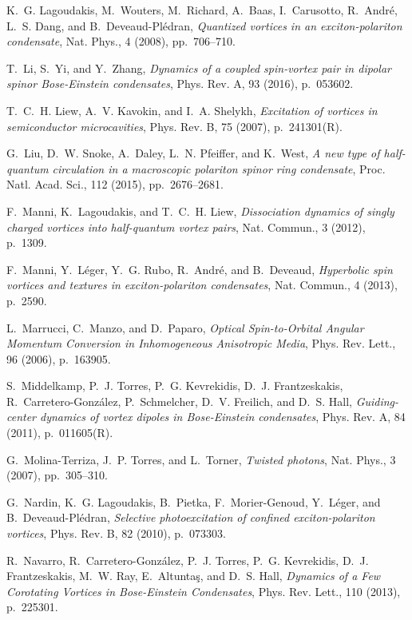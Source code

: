 \documentclass[aps,prb,twocolumn,superscriptaddress,nofootinbib]{revtex4}
\begin{document}
\begin{thebibliography}{10}
{\sc K.~G. Lagoudakis, M.~Wouters, M.~Richard, A.~Baas, I.~Carusotto,
  R.~Andr\'{e}, L.~S. Dang, and B.~Deveaud-Pl\'{e}dran}, {\em Quantized
  vortices in an exciton-polariton condensate}, Nat. Phys., 4 (2008),
  pp.~706--710.

{\sc T.~Li, S.~Yi, and Y.~Zhang}, {\em Dynamics of a coupled spin-vortex pair
  in dipolar spinor {Bose}-{Einstein} condensates}, Phys. Rev. A, 93 (2016),
  p.~053602.

{\sc T.~C.~H. Liew, A.~V. Kavokin, and I.~A. Shelykh}, {\em Excitation of
  vortices in semiconductor microcavities}, Phys. Rev. B, 75 (2007),
  p.~241301(R).

{\sc G.~Liu, D.~W. Snoke, A.~Daley, L.~N. Pfeiffer, and K.~West}, {\em A new
  type of half-quantum circulation in a macroscopic polariton spinor ring
  condensate}, Proc. Natl. Acad. Sci., 112 (2015), pp.~2676--2681.

{\sc F.~Manni, K.~Lagoudakis, and T.~C.~H. Liew}, {\em {Dissociation dynamics
  of singly charged vortices into half-quantum vortex pairs}}, Nat. Commun., 3
  (2012), p.~1309.

{\sc F.~Manni, Y.~L\'{e}ger, Y.~G. Rubo, R.~Andr\'{e}, and B.~Deveaud}, {\em
  {Hyperbolic spin vortices and textures in exciton-polariton condensates}},
  Nat. Commun., 4 (2013), p.~2590.

{\sc L.~Marrucci, C.~Manzo, and D.~Paparo}, {\em {Optical Spin-to-Orbital
  Angular Momentum Conversion in Inhomogeneous Anisotropic Media}}, Phys. Rev.
  Lett., 96 (2006), p.~163905.

{\sc S.~Middelkamp, P.~J. Torres, P.~G. Kevrekidis, D.~J. Frantzeskakis,
  R.~Carretero-Gonz\'{a}lez, P.~Schmelcher, D.~V. Freilich, and D.~S. Hall},
  {\em Guiding-center dynamics of vortex dipoles in {Bose}-{Einstein}
  condensates}, Phys. Rev. A, 84 (2011), p.~011605(R).

{\sc G.~Molina-Terriza, J.~P. Torres, and L.~Torner}, {\em Twisted photons},
  Nat. Phys., 3 (2007), pp.~305--310.

{\sc G.~Nardin, K.~G. Lagoudakis, B.~Pietka, F.~Morier-Genoud, Y.~L\'{e}ger,
  and B.~Deveaud-Pl\'{e}dran}, {\em {Selective photoexcitation of confined
  exciton-polariton vortices}}, Phys. Rev. B, 82 (2010), p.~073303.

{\sc R.~Navarro, R.~Carretero-Gonz{\'a}lez, P.~J. Torres, P.~G. Kevrekidis,
  D.~J. Frantzeskakis, M.~W. Ray, E.~Altunta{\c{s}}, and D.~S. Hall}, {\em
  Dynamics of a {Few} {Corotating} {Vortices} in {Bose}-{Einstein}
  {Condensates}}, Phys. Rev. Lett., 110 (2013), p.~225301.


\end{thebibliography}
\end{document}
